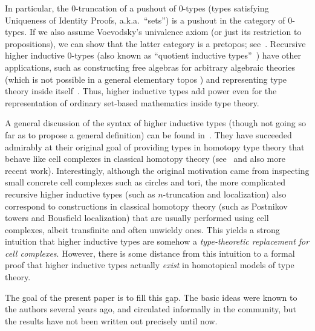 \documentclass[referee]{psp}
\begin{document}
In particular, the $0$-truncation of a pushout of $0$-types (types satisfying Uniqueness of Identity Proofs, a.k.a.\ ``sets'') is a pushout in the category of $0$-types.
If we also assume Voevodsky's univalence axiom (or just its restriction to propositions), we can show that the latter category is a pretopos; see~\cite[Chapter 10]{hottbook}.
Recursive higher inductive $0$-types (also known as ``quotient inductive types''~\cite{acdf:qiits}) have other applications, such as constructing free algebras for arbitrary algebraic theories (which is not possible in a general elementary topos \cite{blass:freealg}) and representing type theory inside itself~\cite{ak:tt-qit}.
Thus, higher inductive types add power even for the representation of ordinary set-based mathematics inside type theory.

A general discussion of the syntax of higher inductive types (though not going so far as to propose a general definition) can be found in~\cite[Chapter 6]{hottbook}.
They have succeeded admirably at their original goal of providing types in homotopy type theory that behave like cell complexes in classical homotopy theory (see~\cite[Chapter 8]{hottbook} and also more recent work).
Interestingly, although the original motivation came from inspecting small concrete cell complexes such as circles and tori, the more complicated recursive higher inductive types (such as $n$-truncation and localization) also correspond to constructions in classical homotopy theory (such as Postnikov towers and Bousfield localization) that are usually performed using cell complexes, albeit transfinite and often unwieldy ones.
This yields a strong intuition that higher inductive types are somehow a \emph{type-theoretic replacement for cell complexes}.
However, there is some distance from this intuition to a formal proof that higher inductive types actually \emph{exist} in homotopical models of type theory.

The goal of the present paper is to fill this gap.
The basic ideas were known to the authors several years ago, and circulated informally in the community, but the results have not been written out precisely until now.
\end{document}
